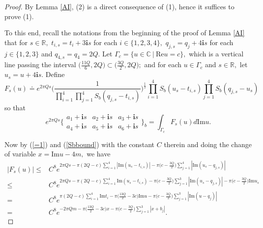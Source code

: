 \documentclass[11pt]{article}
\theoremstyle{remark}
\theoremstyle{remark}
\numberwithin{equation}{section}
\begin{document}
\begin{proof} By Lemma \ref{AI}, (2) is a direct consequence of (1), hence it suffices to prove (1).
\medskip

To this end, recall the notations from the beginning of the proof of Lemma \ref{AI} that for  $s\in\mathbb R,$ $t_{i,s}=t_i+ 3\mathbf is$ for each $i\in\{1,2,3,4\},$ $q_{j,s}=q_j+4\mathbf is$ for each $j\in\{1,2,3\}$ and $q_{4,s}=q_4=2Q.$ Let  $\Gamma_c=\{ u\in \mathbb C\ |\ \mathrm{Re}u =c\},$ which is a vertical line passing the interval $\big(\frac{11Q}{6},2Q\big)\subset\big(\frac{3Q}{2},2Q\big);$ and for each $u\in \Gamma_c$ and $s\in\mathbb R,$ let 
$u_s=u+4\mathbf i s.$ Define
$$F_s(u)\doteq e^{2\pi Qs}\Bigg(\frac{1}{\prod_{i=1}^4\prod_{j=1}^4S_b(q_{j,s}-t_{i,s})}\Bigg)^{\frac{1}{2}} \prod_{i=1}^4S_b(u_s-t_{i,s})\prod_{j=1}^4S_b(q_{j,s}-u_s)$$
so that 
\begin{equation}\label{Fsint}
    e^{2\pi Q s} \bigg\{\begin{matrix} a_1+\mathbf is & a_2 +\mathbf is & a_3+\mathbf is  \\ a_4+\mathbf is & a_5+\mathbf is & a_6+\mathbf is \end{matrix} \bigg\}_b=\int_{\Gamma_c} F_s(u)d\mathrm{Im}u.
\end{equation}


 
Now by (\ref{=1}) and (\ref{Sbbound}) with the constant $C$ therein and doing the change of variable $x=\mathrm{Im}u-4m,$ we have 
\begin{equation}\label{Fbound}
\begin{split}
|F_s(u)|\leqslant &C^8 e^{2\pi Qs -\pi(2Q-c)\sum_{i=1}^4|\mathrm{Im}(u_s-t_{i,s})|-\pi \big(c-\frac{3Q}{2}\big)\sum_{j=1}^4|\mathrm{Im}(u_s-q_{j,s})|}\\
\leqslant & C^8 e^{2\pi Qs-\pi(2Q-c)\sum_{i=1}^4 \mathrm{Im}(u_s-t_{i,s})-\pi \big(c-\frac{3Q}{2}\big)\sum_{j=1}^3|\mathrm{Im}(u_s-q_{j,s})|-\pi \big(c-\frac{3Q}{2}\big)\mathrm{Im}u_s}\\
=& C^8 e^{\pi(2Q-c)\sum_{i=1}^4\mathrm{Im}t_i-\pi\big(\frac{13Q}{2}-3c\big)\mathrm{Im}u -\pi\big(c-\frac{3Q}{2}\big)\sum_{j=1}^3|\mathrm{Im}(u-q_j)|}\\
=& C^8 e^{-2\pi Qm-\pi\big(\frac{13Q}{2}-3c\big)x -\pi\big(c-\frac{3Q}{2}\big)\sum_{j=1}^3|x+b_j|}.
\end{split}
\end{equation}


\end{proof}
\end{document}
